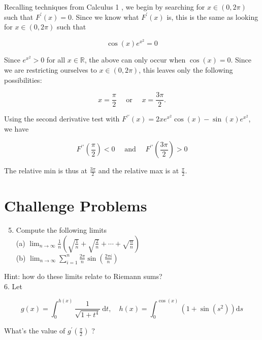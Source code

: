\documentclass[10pt]{article}
\begin{document}
Recalling techniques from Calculus 1 , we begin by searching for $x \in(0,2 \pi)$ such that $F^{\prime}(x)=0$. Since we know what $F^{\prime}(x)$ is, this is the same as looking for $x \in(0,2 \pi)$ such that

$$
\cos (x) e^{x^{2}}=0
$$

Since $e^{x^{2}}>0$ for all $x \in \mathbb{R}$, the above can only occur when $\cos (x)=0$. Since we are restricting ourselves to $x \in(0,2 \pi)$, this leaves only the following possibilities:

$$
x=\frac{\pi}{2} \quad \text { or } \quad x=\frac{3 \pi}{2} .
$$

Using the second derivative test with $F^{\prime \prime}(x)=2 x e^{x^{2}} \cos (x)-\sin (x) e^{x^{2}}$, we have

$$
F^{\prime \prime}\left(\frac{\pi}{2}\right)<0 \quad \text { and } \quad F^{\prime \prime}\left(\frac{3 \pi}{2}\right)>0
$$

The relative min is thus at $\frac{3 \pi}{2}$ and the relative max is at $\frac{\pi}{2}$.

\section*{Challenge Problems}
\begin{enumerate}
  \setcounter{enumi}{4}
  \item Compute the following limits\\
(a) $\lim _{n \rightarrow \infty} \frac{1}{n}\left(\sqrt{\frac{1}{n}}+\sqrt{\frac{2}{n}}+\cdots+\sqrt{\frac{n}{n}}\right)$\\
(b) $\lim _{n \rightarrow \infty} \sum_{i=1}^{n} \frac{2 \pi}{n} \sin \left(\frac{2 \pi i}{n}\right)$
\end{enumerate}

Hint: how do these limits relate to Riemann sums?\\
6. Let

$$
g(x)=\int_{0}^{h(x)} \frac{1}{\sqrt{1+t^{4}}} \mathrm{~d} t, \quad h(x)=\int_{0}^{\cos (x)}\left(1+\sin \left(s^{2}\right)\right) \mathrm{d} s
$$

What's the value of $g^{\prime}\left(\frac{\pi}{2}\right)$ ?
\end{document}
